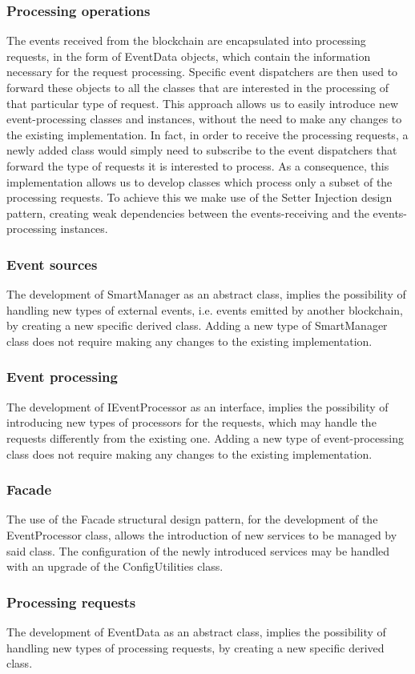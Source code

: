 		\subsubsection{Processing operations}
		The events received from the blockchain are encapsulated into processing requests, in the form of EventData objects, which contain the information necessary for the request processing. Specific event dispatchers are then used to forward these objects to all the classes that are interested in the processing of that particular type of request.
		This approach allows us to easily introduce new event-processing classes and instances, without the need to make any changes to the existing implementation. In fact, in order to receive the processing requests, a newly added class would simply need to subscribe to the event dispatchers that forward the type of requests it is interested to process. As a consequence, this implementation allows us to develop classes which process only a subset of the processing requests. To achieve this we make use of the Setter Injection design pattern, creating weak dependencies between the events-receiving and the events-processing instances.
		\subsubsection{Event sources}
		The development of SmartManager as an abstract class, implies the possibility of handling new types of external events, i.e. events emitted by another blockchain, by creating a new specific derived class. Adding a new type of SmartManager class does not require making any changes to the existing implementation.
		\subsubsection{Event processing}
		The development of IEventProcessor as an interface, implies the possibility of introducing new types of processors for the requests, which may handle the requests differently from the existing one. Adding a new type of event-processing class does not require making any changes to the existing implementation.
		\subsubsection{Facade}
		The use of the Facade structural design pattern, for the development of the EventProcessor class, allows the introduction of new services to be managed by said class. The configuration of the newly introduced services may be handled with an upgrade of the ConfigUtilities class.
		\subsubsection{Processing requests}
		The development of EventData as an abstract class, implies the possibility of handling new types of processing requests, by creating a new specific derived class.
